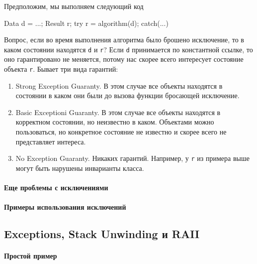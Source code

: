 Предположим, мы выполняем следующий код
\begin{cppcode}
Data d = ...;
Result r;
try {
  r = algorithm(d);
} catch(...) {
}
\end{cppcode}
Вопрос, если во время выполнения алгоритма было брошено исключение, то в каком состоянии находятся \verb"d" и \verb"r"?
Если \verb"d" принимается по константной ссылке, то оно гарантировано не меняется, потому нас скорее всего интересует состояние объекта \verb"r".
Бывает три вида гарантий:
\begin{enumerate}
\item Strong Exception Guaranty.
В этом случае все объекты находятся в состоянии в каком они были до вызова функции бросающей исключение.

\item Basic Exceptioni Guaranty.
В этом случае все объекты находятся в корректном состоянии, но неизвестно в каком.
Объектами можно пользоваться, но конкретное состояние не известно и скорее всего не представляет интереса.

\item No Exception Guaranty.
Никаких гарантий.
Например, у \verb"r" из примера выше могут быть нарушены инварианты класса.
\end{enumerate}

\paragraph{Еще проблемы с исключениями}

\paragraph{Примеры использования исключений}

\subsection{Exceptions, Stack Unwinding и RAII}

\paragraph{Простой пример}

